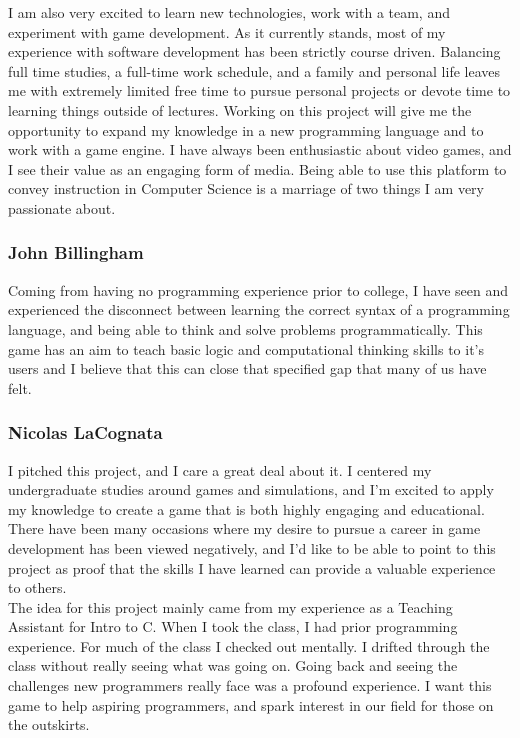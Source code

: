 I am also very excited to learn new technologies, work with a team, and
experiment with game development. As it currently stands, most of my experience
with software development has been strictly course driven. Balancing full time
studies, a full-time work schedule, and a family and personal life leaves me
with extremely limited free time to pursue personal projects or devote time to
learning things outside of lectures. Working on this project will give me the
opportunity to expand my knowledge in a new programming language and to work
with a game engine. I have always been enthusiastic about video games, and I see
their value as an engaging form of media. Being able to use this platform to
convey instruction in Computer Science is a marriage of two things I am very
passionate about.

\subsubsection{John Billingham}
Coming from having no programming experience prior to college, I have seen and
experienced the disconnect between learning the correct syntax of a programming
language, and being able to think and solve problems programmatically. This game
has an aim to teach basic logic and computational thinking skills to it’s users
and I believe that this can close that specified gap that many of us have felt.

\subsubsection{Nicolas LaCognata}
I pitched this project, and I care a great deal about it. I centered my
undergraduate studies around games and simulations, and I’m excited to apply my
knowledge to create a game that is both highly engaging and educational. There
have been many occasions where my desire to pursue a career in game development
has been viewed negatively, and I’d like to be able to point to this project as
proof that the skills I have learned can provide a valuable experience to
others.\\

The idea for this project mainly came from my experience as a Teaching Assistant for Intro to
C. When I took the class, I had prior programming experience. For much of the class I
checked out mentally. I drifted through the class without really seeing what was going on.
Going back and seeing the challenges new programmers really face was a profound
experience. I want this game to help aspiring programmers, and spark interest in
our field for those on the outskirts.

